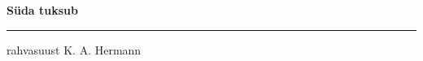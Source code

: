 \documentclass[10pt]{book}
\begin{document}
{
  \samepage
  \raggedbottom
  \raggedright
  \sloppy


  \vspace{0.2in}

  \noindent\begin{minipage}{.1\textwidth}
    \hfill\vspace{0.1in}
  \end{minipage}%
  \noindent\begin{minipage}{.8\textwidth}
    \centering
    \bfseries
    \large S\"uda tuksub
  \end{minipage}%
  \noindent\begin{minipage}{.1\textwidth}
      \hfill\vspace{0.1in}
  \end{minipage}

  \nopagebreak[4]
  \vspace{0.1in}
  \nopagebreak[4]
  \hrule height 0.05ex
  \nopagebreak[4]
  \vspace{-0.05in}

  {\footnotesize rahvasuust \hfill K. A. Hermann }\\
  \vspace{0.01in}



}
\end{document}
